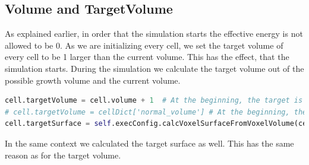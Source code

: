 \subsection{Volume and TargetVolume}
As explained earlier, in order that the simulation starts the effective energy is not allowed to be 0. As we are initializing every cell, we set the target volume of every cell to be 1 larger than the current volume. This has the effect, that the simulation starts. During the simulation we calculate the target volume out of the possible growth volume and the current volume.
\begin{lstlisting}[language=Python, caption = set target Volume and Surface of a cell]
cell.targetVolume = cell.volume + 1  # At the beginning, the target is the actual size.
# cell.targetVolume = cellDict['normal_volume'] # At the beginning, the target is the actual size.
cell.targetSurface = self.execConfig.calcVoxelSurfaceFromVoxelVolume(cell.targetVolume)
\end{lstlisting}
In the same context we calculated the target surface as well. This has the same reason as for the target volume. 







